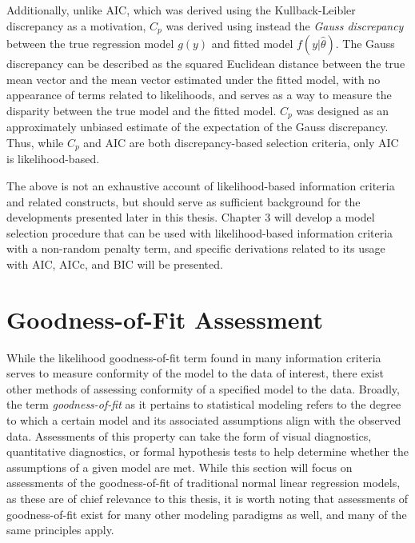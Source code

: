 		Additionally, unlike AIC, which was derived using the Kullback-Leibler discrepancy as a motivation, $C_p$ was derived using instead the \textit{Gauss discrepancy} between the true regression model
		$g(y)$ and fitted model $f(y|\hat{\theta})$. The Gauss discrepancy can be described as the squared Euclidean distance between the true mean vector and the mean vector estimated under the fitted
		model, with no appearance of terms related to likelihoods, and serves as a way to measure the disparity between the true model and the fitted model. $C_p$ was designed as an approximately unbiased
		estimate of the expectation of the Gauss discrepancy. Thus, while $C_p$ and AIC are both discrepancy-based selection criteria, only AIC is likelihood-based.

		The above is not an exhaustive account of likelihood-based information criteria and related constructs, but should serve as sufficient background for the developments presented
		later in this thesis. Chapter 3 will develop a model selection procedure that can be used with likelihood-based information criteria with a non-random penalty term, and specific
		derivations related to its usage with AIC, AICc, and BIC will be presented.
		
		\section{Goodness-of-Fit Assessment}

		While the likelihood goodness-of-fit term found in many information criteria serves to measure conformity of the model to the data of interest, there exist other methods of
		assessing conformity of a specified model to the data. Broadly, the term \textit{goodness-of-fit} as it pertains to statistical modeling refers to the degree to which a certain model
		and its associated assumptions align with the observed data. Assessments of this property can take the form of visual diagnostics, quantitative diagnostics, or formal hypothesis tests to help
		determine whether the assumptions of a given model are met. While this section will focus on assessments of the goodness-of-fit of traditional normal linear regression models, as these are of
		chief relevance to this thesis, it is worth noting that assessments of goodness-of-fit exist for many other modeling paradigms as well, and many of the same principles apply.

